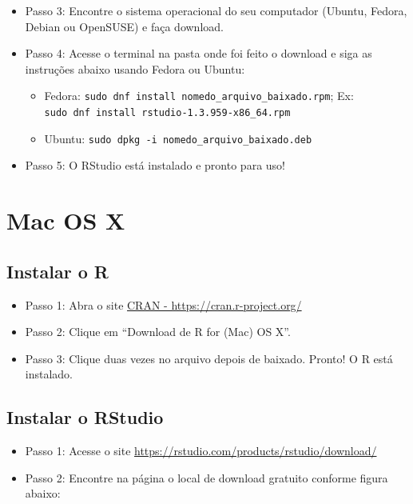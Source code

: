 \documentclass[
  10pt,
  brazil,
  a4paper,
  twoside, notitlepage, openright]{book}
\providecommand{\tightlist}{%
  \setlength{\itemsep}{0pt}\setlength{\parskip}{0pt}}
\begin{document}
\begin{itemize}
\tightlist
\item
  Passo 3: Encontre o sistema operacional do seu computador (Ubuntu, Fedora, Debian ou OpenSUSE) e faça download.\\
\item
  Passo 4: Acesse o terminal na pasta onde foi feito o download e siga as instruções abaixo usando Fedora ou Ubuntu:

  \begin{itemize}
  \tightlist
  \item
    Fedora: \texttt{sudo\ dnf\ install\ nomedo\_arquivo\_baixado.rpm}; Ex: \texttt{sudo\ dnf\ install\ rstudio-1.3.959-x86\_64.rpm}
  \item
    Ubuntu: \texttt{sudo\ dpkg\ -i\ nomedo\_arquivo\_baixado.deb}\\
  \end{itemize}
\item
  Passo 5: O RStudio está instalado e pronto para uso!
\end{itemize}

\hypertarget{mac-os-x}{%
\section{Mac OS X}\label{mac-os-x}}

\hypertarget{instalar-o-r-1}{%
\subsection{Instalar o R}\label{instalar-o-r-1}}

\begin{itemize}
\tightlist
\item
  Passo 1: Abra o site \href{https://cran.r-project.org/}{CRAN - https://cran.r-project.org/}
\item
  Passo 2: Clique em ``Download de R for (Mac) OS X''.\\
\item
  Passo 3: Clique duas vezes no arquivo depois de baixado. Pronto! O R está instalado.
\end{itemize}

\hypertarget{instalar-o-rstudio-1}{%
\subsection{Instalar o RStudio}\label{instalar-o-rstudio-1}}

\begin{itemize}
\tightlist
\item
  Passo 1: Acesse o site \url{https://rstudio.com/products/rstudio/download/}\\
\item
  Passo 2: Encontre na página o local de download gratuito conforme figura abaixo:
\end{itemize}
\end{document}
